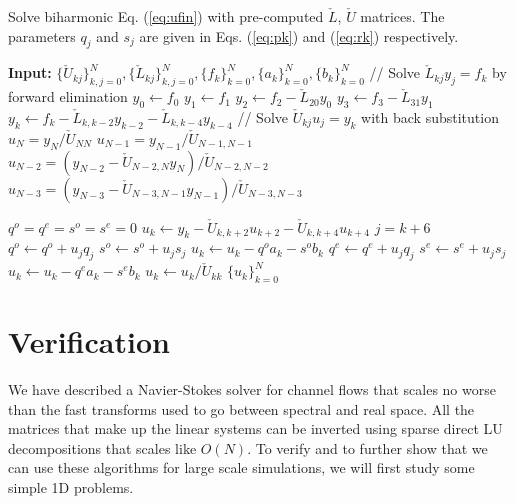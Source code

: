 \documentclass[11pt, oneside]{article}
\newcommand{\N}[1]{\check{#1}}
\begin{document}
\begin{algorithm}
	\caption{Solve biharmonic Eq. (\ref{eq:ufin}) with pre-computed $\N{L}$, 
	$\N{U}$ 
	matrices. The parameters $q_j$ and $s_j$ are given in Eqs. (\ref{eq:pk}) 
	and 
	(\ref{eq:rk}) respectively. }
	\label{alg:SolveBiharmonic}
	\begin{algorithmic}[1]
		  \State \textbf{Input:} $\{\N{U}_{kj}\}_{k,j=0}^{N}, 
		  \{\N{L}_{kj}\}_{k,j=0}^{N}, 
		  \{f_k\}_{k=0}^{N}, \{a_k\}_{k=0}^{N}, \{b_k\}_{k=0}^{N}$ 
		  \State // Solve $\N{L}_{kj}y_j=f_k$ by forward elimination 
		  \State $y_0 \gets f_0$
		  \State $y_1 \gets f_1$
		  \State $y_2 \gets f_2 - \N{L}_{20}y_{0}$
		  \State $y_3 \gets f_3 - \N{L}_{31}y_{1}$
		  \State $y_k \gets f_k - \N{L}_{k,k-2}y_{k-2} - \N{L}_{k, k-4}y_{k-4}$
		  \EndFor
		  \State // Solve $\N{U}_{kj}u_j=y_k$ with back 
		  substitution                    
		  \State $u_N = y_N / \N{U}_{NN}$
	      \State $u_{N-1} = y_{N-1} / \N{U}_{N-1,N-1}$
	      \State $u_{N-2} = \left(y_{N-2} - \N{U}_{N-2, 
	      N}y_N\right)/\N{U}_{N-2,N-2}$
	      \State $u_{N-3} = \left(y_{N-3} - \N{U}_{N-3, 
	      N-1}y_{N-1}\right)/\N{U}_{N-3,N-3}$
	      
	      \State $q^o = q^e = s^o = s^e = 0$
		  \State $u_k \gets y_k - \N{U}_{k, k+2} u_{k+2} - \N{U}_{k, k+4} 
		  u_{k+4} $ 
		  \State $j=k+6$
		    \State $q^o \gets q^o + u_{j}q_{j}$
		    \State $s^o \gets s^o + u_{j}s_{j}$
		    \State $u_k \gets u_k - q^o a_k - s^o b_k $	    
		  \Else
		    \State $q^e \gets q^e + u_{j}q_{j}$
		    \State $s^e \gets s^e + u_{j}s_{j}$	  
		    \State $u_k \gets u_k - q^e a_k - s^e b_k $
		  \EndIf
		  \EndIf
		  \State $u_k \gets  u_k / \N{U}_{kk}$
		  \EndFor
		  \State \Return $\{u_k\}_{k=0}^{N}$  
		  
		\EndProcedure
	\end{algorithmic}
\end{algorithm}

\section{Verification}
We have described a Navier-Stokes solver for channel flows that scales no worse 
than the fast transforms used to go between spectral and real space. All the 
matrices that make up the linear systems can be inverted using sparse direct LU 
decompositions that scales like $O(N)$. To verify and to further show that we 
can use these algorithms for large scale simulations, we will first study some 
simple 1D problems. 
\end{document}
